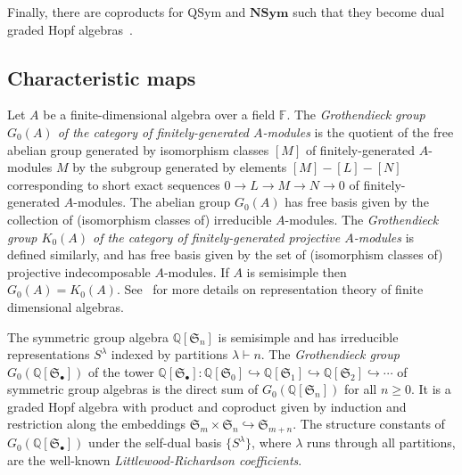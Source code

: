 \documentclass[ALCO,ThmDefs,published]{cedram}
\newcommand{\symm}{{\mathfrak{S}}}
\newcommand{\QQ}{{\mathbb {Q}}}
\newcommand{\FF}{{\mathbb{F}}}
\theoremstyle{plain}
\newcommand{\NSym}{{\mathbf {NSym}}}
\newcommand{\QSym}{{\mathrm {QSym}}}
\newcommand{\symm}{{\mathfrak{S}}}
\newcommand{\QQ}{{\mathbb {Q}}}
\newcommand{\FF}{{\mathbb{F}}}
\begin{document}
Finally, there are coproducts for $\QSym$ and $\NSym$ such that they become dual graded Hopf algebras~\cite[\S5]{GrinbergReiner}.















\subsection{Characteristic maps}
\label{char}
Let $A$ be a finite-dimensional algebra over a field $\FF$.
The \emph{Grothendieck group $G_0(A)$ of the category of finitely-generated $A$-modules} is the quotient of the free abelian group generated by isomorphism classes $[M]$ of finitely-generated $A$-modules $M$ by the subgroup generated by  elements $[M] - [L] - [N]$ corresponding to short exact sequences $0 \rightarrow L \rightarrow M \rightarrow N \rightarrow 0$ of finitely-generated $A$-modules.
The abelian group $G_0(A)$ has free basis given by the collection of (isomorphism classes of) irreducible $A$-modules.
The \emph{Grothendieck group $K_0(A)$ of the category of finitely-generated projective $A$-modules} is defined similarly, and has free basis given by the set of (isomorphism classes of) projective indecomposable $A$-modules.
If $A$ is semisimple then $G_0(A)=K_0(A)$.
See~\cite{ASS} for more details on representation theory of finite dimensional algebras.

The symmetric group algebra $\QQ[\symm_n]$ is semisimple and has irreducible representations $S^\lambda$ indexed by partitions $\lambda\vdash n$.  
The \emph{Grothendieck group} $G_0(\QQ[\symm_\bullet])$ of the tower $\QQ[\symm_\bullet]: \QQ[\symm_0]\hookrightarrow \QQ[\symm_1]\hookrightarrow \QQ[\symm_2] \hookrightarrow \cdots$ of symmetric group algebras is the direct sum of $G_0(\QQ[\symm_n])$ for all $n\ge0$.
It is a graded Hopf algebra with product and coproduct given by induction and restriction along the embeddings 
$\symm_m \times \symm_n\hookrightarrow\symm_{m+n}$.
The structure constants of $G_0(\QQ[\symm_\bullet])$ under the self-dual basis $\{S^{\lambda}\}$, where $\lambda$ runs through all partitions, are the well-known \emph{Littlewood-Richardson coefficients}. 

\end{document}
